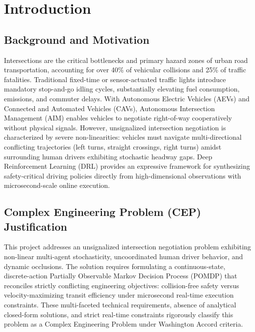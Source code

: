 \chapter{Introduction}
\label{ch:introduction}

\section{Background and Motivation}
Intersections are the critical bottlenecks and primary hazard zones of urban road transportation, accounting for over 40\% of vehicular collisions and 25\% of traffic fatalities. Traditional fixed-time or sensor-actuated traffic lights introduce mandatory stop-and-go idling cycles, substantially elevating fuel consumption, emissions, and commuter delays. With Autonomous Electric Vehicles (AEVs) and Connected and Automated Vehicles (CAVs), Autonomous Intersection Management (AIM) enables vehicles to negotiate right-of-way cooperatively without physical signals. However, unsignalized intersection negotiation is characterized by severe non-linearities: vehicles must navigate multi-directional conflicting trajectories (left turns, straight crossings, right turns) amidst surrounding human drivers exhibiting stochastic headway gaps. Deep Reinforcement Learning (DRL) provides an expressive framework for synthesizing safety-critical driving policies directly from high-dimensional observations with microsecond-scale online execution.

\section{Complex Engineering Problem (CEP) Justification}
\label{sec:cep}
This project addresses an unsignalized intersection negotiation problem exhibiting non-linear multi-agent stochasticity, uncoordinated human driver behavior, and dynamic occlusions. The solution requires formulating a continuous-state, discrete-action Partially Observable Markov Decision Process (POMDP) that reconciles strictly conflicting engineering objectives: collision-free safety versus velocity-maximizing transit efficiency under microsecond real-time execution constraints. These multi-faceted technical requirements, absence of analytical closed-form solutions, and strict real-time constraints rigorously classify this problem as a Complex Engineering Problem under Washington Accord criteria.

